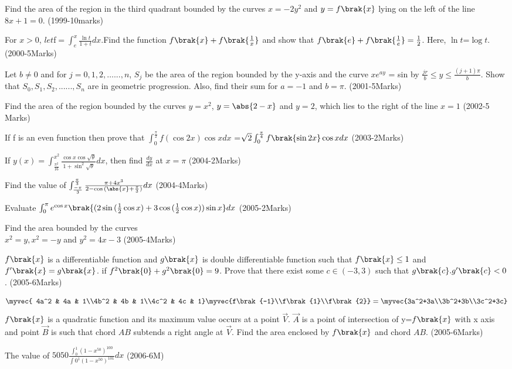 \item Find the area of the region in the third quadrant bounded by the curves $x=-2y^2$ and $y=f\brak{x}$ lying on the left of the line $8x+1=0$. 						
\hfill{(1999-10marks)}\\
\item For $x > 0 $, $let $f$=\int_{e}^{x}\frac{\ln{t}}{1+t}dx$.Find the function $f\brak{x} + f\brak{\frac{1}{x}}$
 and show that $f\brak{e}+f\brak{\frac{1}{e}}=
\frac{1}{2}$. Here, $\ln{t}$=$\log{t}$.
\hfill{(2000-5Marks)}
\item Let $b\neq0$ and for $j=0, 1, 2, \dots{...}, n$, $S_j$ be the area of the region bounded by the y-axis and the curve $xe^{ay}$ = sin by $\frac{jr}{b} \le y \le \frac{(j+1)\pi}{b}$. Show that  $S_0,S_1,S_2,......,S_n$ are in geometric progression. Also, find their sum for $a=-1$ and $b= \pi$. 
\hfill{(2001-5Marks)}
\item Find the area of the region bounded by the curves $y=x^2$, $y=\abs{2-x}$ and $y=2$, which lies to the right of the line $x=1$
\hfill{(2002-5 Marks)}
\item If f is an even function then prove that 	$\int_{0}^{\frac{\pi}{2}}f(\cos{2x})\cos{x}dx$ =$\sqrt{2}\int_{0}^{\frac{\pi}{4}}f\brak{\sin{2x}}\cos{x}dx$
\hfill{(2003-2Marks)}
\item If $y(x)=\int_{\frac{\pi^2}{16}}^{x^2}\frac{\cos{x}\cos{\sqrt{\theta}}}{1+\sin^2{\sqrt{\theta}}}dx$, then find $\frac{dy}{dx}$ at $x=\pi$
\hfill{(2004-2Marks)}
\item  Find the value of $\int_{\frac{-\pi}{3}}^{\frac{\pi}{3}}\frac{\pi+4x^3}{2-\cos{(\abs{x}+\frac{\pi}{3})}}dx$
\hfill{(2004-4Marks)}
\item Evaluate $\int_{0}^{\pi}e^{\cos{x}}\brak{(2\sin{(\frac{1}{2}\cos{x}})+3\cos{(\frac{1}{2}\cos{x})})\sin{x}}dx$
\hfill{(2005-2Marks)}
\item Find the area bounded by the curves \\  
$x^2=y,x^2=-y$ and $y^2=4x-3$
\hfill{(2005-4Marks)}
\item  $f\brak{x}$ is a differentiable function and $g\brak{x}$ is  double differentiable function such that $f\brak{x}\le1$ and $f^{\prime}\brak{x}=g\brak{x}$. if $f^2\brak{0}+g^2\brak{0}=9$. Prove that there exist some $c\in(-3,3)$ such that $g\brak{c}.g^{\prime}\brak{c}<0$.
\hfill{(2005-6Marks)}
\item 
  \[
\myvec{ 4a^2 & 4a & 1\\4b^2 & 4b & 1\\4c^2 & 4c & 1}
\myvec{f\brak{-1}\\f\brak{1}\\f\brak{2}} =
\myvec{3a^2+3a\\3b^2+3b\\3c^2+3c}
\]
$f\brak{x}$ is a quadratic function and its maximum value occurs at a point $\vec{V}$. $\vec{A}$ is a point of intersection of y=$f\brak{x}$ with x axis and point $\vec{B}$ is such that chord $AB$ subtends a right angle at $\vec{V}$. Find the area enclosed by $f\brak{x}$ and chord $AB$. 
\hfill{(2005-6Marks)}
\item The value of $5050 \frac{\int_{0}^{1}(1-x^50)^100}{\int{0}^{1} {(1-x^50)^101}}dx$
\hfill{(2006-6M)}




